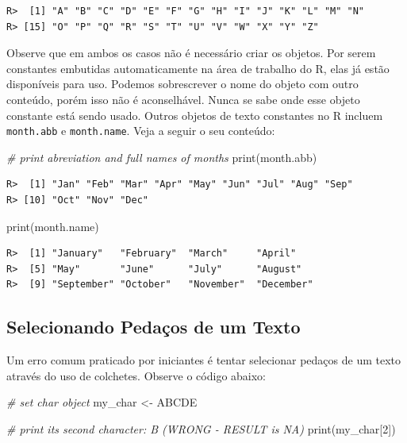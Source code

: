 \documentclass[
  11pt,
]{book}
\newenvironment{Shaded}{\begin{snugshade}}{\end{snugshade}}
\newcommand{\CommentTok}[1]{\textcolor[rgb]{0.37,0.37,0.37}{\textit{#1}}}
\newcommand{\DecValTok}[1]{\textcolor[rgb]{0.06,0.06,0.06}{#1}}
\newcommand{\FunctionTok}[1]{\textcolor[rgb]{0,0,0}{#1}}
\newcommand{\NormalTok}[1]{#1}
\newcommand{\OtherTok}[1]{\textcolor[rgb]{0.37,0.37,0.37}{#1}}
\newcommand{\StringTok}[1]{\textcolor[rgb]{0.5,0.5,0.5}{#1}}
\begin{document}
\begin{verbatim}
R>  [1] "A" "B" "C" "D" "E" "F" "G" "H" "I" "J" "K" "L" "M" "N"
R> [15] "O" "P" "Q" "R" "S" "T" "U" "V" "W" "X" "Y" "Z"
\end{verbatim}

Observe que em ambos os casos não é necessário criar os objetos. Por serem constantes embutidas automaticamente na área de trabalho do R, elas já estão disponíveis para uso. Podemos sobrescrever o nome do objeto com outro conteúdo, porém isso não é aconselhável. Nunca se sabe onde esse objeto constante está sendo usado. Outros objetos de texto constantes no R incluem \texttt{month.abb} e \texttt{month.name}. Veja a seguir o seu conteúdo:  

\begin{Shaded}
\begin{Highlighting}[]
\CommentTok{\# print abreviation and full names of months}
\FunctionTok{print}\NormalTok{(month.abb)}
\end{Highlighting}
\end{Shaded}

\begin{verbatim}
R>  [1] "Jan" "Feb" "Mar" "Apr" "May" "Jun" "Jul" "Aug" "Sep"
R> [10] "Oct" "Nov" "Dec"
\end{verbatim}

\begin{Shaded}
\begin{Highlighting}[]
\FunctionTok{print}\NormalTok{(month.name)}
\end{Highlighting}
\end{Shaded}

\begin{verbatim}
R>  [1] "January"   "February"  "March"     "April"    
R>  [5] "May"       "June"      "July"      "August"   
R>  [9] "September" "October"   "November"  "December"
\end{verbatim}

\hypertarget{selecionando-pedauxe7os-de-um-texto}{%
\subsection{Selecionando Pedaços de um Texto}\label{selecionando-pedauxe7os-de-um-texto}}

Um erro comum praticado por iniciantes é tentar selecionar pedaços de um texto através do uso de colchetes. Observe o código abaixo:

\begin{Shaded}
\begin{Highlighting}[]
\CommentTok{\# set char object}
\NormalTok{my\_char }\OtherTok{\textless{}{-}} \StringTok{\textquotesingle{}ABCDE\textquotesingle{}}

\CommentTok{\# print its second character: \textquotesingle{}B\textquotesingle{} (WRONG {-} RESULT is NA)}
\FunctionTok{print}\NormalTok{(my\_char[}\DecValTok{2}\NormalTok{])}
\end{Highlighting}
\end{Shaded}
\end{document}
